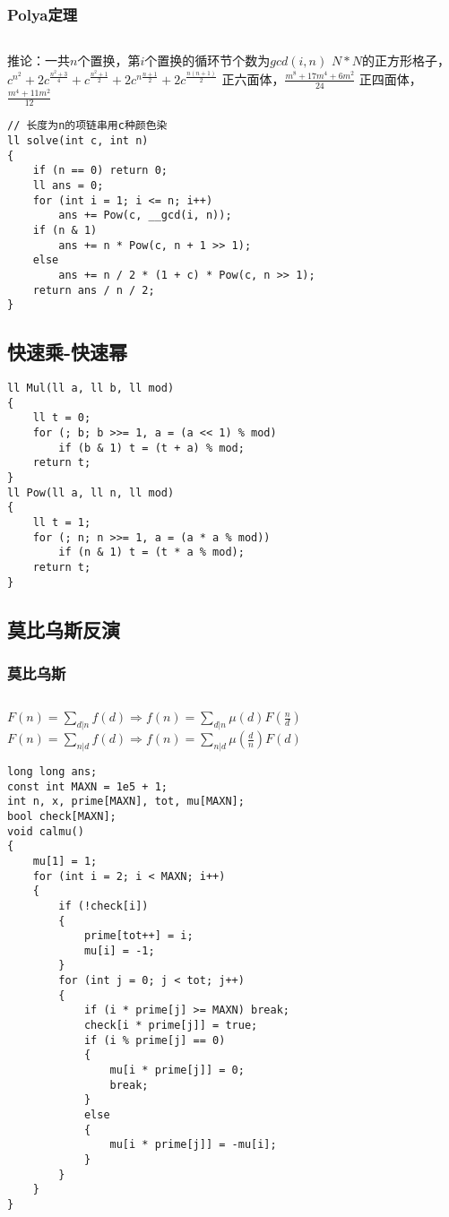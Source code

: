 \documentclass[a4]{article}
\begin{document}
\subsubsection{Polya定理}
\begin{lstlisting}
\end{lstlisting}
推论：一共$n$个置换，第$i$个置换的循环节个数为$gcd(i,n)$
$N*N$的正方形格子，$c^{n^2}+2c^{\frac{n^2+3}{4}}+c^{\frac{n^2+1}{2}}+2c^{n\frac{n+1}{2}}+2c^{\frac{n(n+1)}{2}}$
正六面体，$\frac{m^8+17m^4+6m^2}{24}$
正四面体，$\frac{m^4+11m^2}{12}$
\begin{lstlisting}
// 长度为n的项链串用c种颜色染
ll solve(int c, int n)
{
    if (n == 0) return 0;
    ll ans = 0;
    for (int i = 1; i <= n; i++)
        ans += Pow(c, __gcd(i, n));
    if (n & 1)
        ans += n * Pow(c, n + 1 >> 1);
    else
        ans += n / 2 * (1 + c) * Pow(c, n >> 1);
    return ans / n / 2;
}
\end{lstlisting}
\subsection{快速乘-快速幂}
\begin{lstlisting}
ll Mul(ll a, ll b, ll mod)
{
    ll t = 0;
    for (; b; b >>= 1, a = (a << 1) % mod)
        if (b & 1) t = (t + a) % mod;
    return t;
}
ll Pow(ll a, ll n, ll mod)
{
    ll t = 1;
    for (; n; n >>= 1, a = (a * a % mod))
        if (n & 1) t = (t * a % mod);
    return t;
}
\end{lstlisting}
\subsection{莫比乌斯反演}
\subsubsection{莫比乌斯}
\begin{lstlisting}
\end{lstlisting}
$F(n)=\sum_{d|n}f(d)\Rightarrow f(n)=\sum_{d|n}\mu(d)F(\frac{n}{d})$
$F(n)=\sum_{n|d}f(d)\Rightarrow f(n)=\sum_{n|d}\mu(\frac{d}{n})F(d)$
\begin{lstlisting}
long long ans;
const int MAXN = 1e5 + 1;
int n, x, prime[MAXN], tot, mu[MAXN];
bool check[MAXN];
void calmu()
{
    mu[1] = 1;
    for (int i = 2; i < MAXN; i++)
    {
        if (!check[i])
        {
            prime[tot++] = i;
            mu[i] = -1;
        }
        for (int j = 0; j < tot; j++)
        {
            if (i * prime[j] >= MAXN) break;
            check[i * prime[j]] = true;
            if (i % prime[j] == 0)
            {
                mu[i * prime[j]] = 0;
                break;
            }
            else
            {
                mu[i * prime[j]] = -mu[i];
            }
        }
    }
}
\end{lstlisting}
\end{document}
